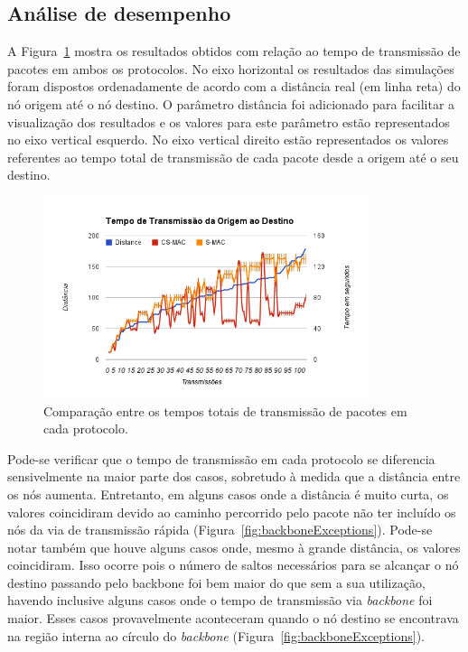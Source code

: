 \subsection{Análise de desempenho}

A Figura~\ref{fig:transmissionTimeComparison} mostra os resultados obtidos com relação ao tempo de transmissão de pacotes em ambos os protocolos. No eixo horizontal os resultados das simulações foram dispostos ordenadamente de acordo com a distância real (em linha reta) do nó origem até o nó destino. O parâmetro distância foi adicionado para facilitar a visualização dos resultados e os valores para este parâmetro estão representados no eixo vertical esquerdo. No eixo vertical direito estão representados os valores referentes ao tempo total de transmissão de cada pacote desde a origem até o seu destino. 

\begin{figure}[!htb]
\centering
\includegraphics[width=360px,height=223px]{./Pictures/TransmissionTimeComparison.png}
\caption{Comparação entre os tempos totais de transmissão de pacotes em cada protocolo.} %
\label{fig:transmissionTimeComparison} %
\end{figure}

Pode-se verificar que o tempo de transmissão em cada protocolo se diferencia sensivelmente na maior parte dos casos, sobretudo à medida que a distância entre os nós aumenta. Entretanto, em alguns casos onde a distância é muito curta, os valores coincidiram devido ao caminho percorrido pelo pacote não ter incluído os nós da via de transmissão rápida (Figura~\ref{fig:backboneExceptions}). Pode-se notar também que houve alguns casos onde, mesmo à grande distância, os valores coincidiram. Isso ocorre pois o número de saltos necessários para se alcançar o nó destino passando pelo backbone foi bem maior do que sem a sua utilização, havendo inclusive alguns casos onde o tempo de transmissão via \emph{backbone} foi maior. Esses casos provavelmente aconteceram quando o nó destino se encontrava na região interna ao círculo do \emph{backbone} (Figura~\ref{fig:backboneExceptions}).

